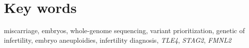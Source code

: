 \section*{Key words}

miscarriage, embryos, whole-genome sequencing, variant prioritization, genetic of infertility, embryo aneuploidies, infertility diagnosis, \textit{TLE4}, \textit{STAG2}, \textit{FMNL2}
